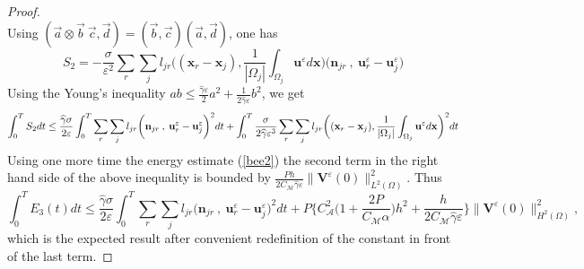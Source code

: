 \documentclass[a4paper,french,english,10pt]{article}
\newcommand\ljr{l_{jr}}
\newcommand\njr{\mathbf{n}_{jr}}
\newcommand\uu{\mathbf{u}}
\newcommand\eps{\varepsilon}
\newcommand\x{\mathbf{x}}
\newcommand\V{\mathbf{V}}
\begin{document}
\begin{proof}
\begin{equation*}
\end{equation*}
Using $(\vec{a}\otimes\vec{b}\:\vec{c},\vec{d}) 
= (\vec{b},\vec{c})(\vec{a},\vec{d})$, one has 
\begin{equation*}
S_2 = -\frac{\sigma}{\eps^2} \sum_r
\sum_j \ljr \bigg( (\x_r-\x_j), \frac{1}{|\Omega_j|}\int_{\Omega_j}
\uu^{\eps} d\x \bigg) \bigg(  \njr  \: , \:
\textbf{u}_r^{\eps}-\textbf{u}_j^{\eps} \bigg)
\end{equation*}
Using the  Young's inequality  $ab \leq \frac{\widehat \gamma \eps }2 a^2+\frac1{2\widehat \gamma \eps } b^2 $, we get
$$\int_0^T
S_2 dt \leq \frac{\widehat{\gamma} \sigma}{2\eps}\int_0^T\sum_r \sum_j \ljr \bigg( 
\njr  \: , \: \textbf{u}_r^{\eps}-\textbf{u}_j^{\eps} \bigg)^2 dt\\
+
\int_0^T\frac{\sigma}{2\widehat{\gamma}  \eps^3}\sum_r \sum_j \ljr \bigg( (\x_r-\x_j),
\frac{1}{|\Omega_j|}\int_{\Omega_j} \uu^{\eps} d\x \bigg) ^2dt
$$
Using one more time the energy estimate (\ref{bee2}) the second term in the right hand side of the above inequality  is bounded by
 $\frac{ P h}{2 C_\mathcal M \widehat \gamma \eps} \| \V^\eps(0)\|^2_{ L^2(\Omega)}$. Thus 
$$
\int _0^TE_3 (t)dt \leq 
\frac{\widehat{\gamma} \sigma}{2\eps}\int_0^T\sum_r \sum_j \ljr \bigg( 
\njr  \: , \: \textbf{u}_r^{\eps}-\textbf{u}_j^{\eps} \bigg)^2 dt 
+
 P \bigg\{ C_{\mathcal A}^2\bigg( 1 + \frac{2P}{C_\mathcal M\alpha} \bigg) h^2 
+
\frac{  h}{2 C_\mathcal M \widehat{\gamma}\eps} \bigg\} \|  \mathbf{V}^{\eps}(0) \|_{H^2(\Omega)}^2 ,
$$
which is the expected result after convenient redefinition of the constant in front of the last term.
\end{proof}
\end{document}
